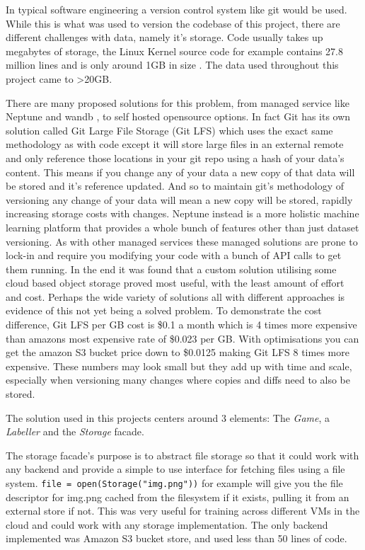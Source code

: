 In typical software engineering a version control system like git \cite{} would be used.  While this is what was used to version the codebase of this project,
there are different challenges with data, namely it's storage.  Code usually takes up megabytes of storage, the Linux Kernel source code for example contains
27.8 million lines and is only around 1GB in size \cite{}.  The data used throughout this project came to >20GB.

There are many proposed solutions for this problem, from managed service like Neptune \cite{} and wandb \cite{}, to self hosted opensource options.  In fact Git has its own
solution called Git Large File Storage (Git LFS) \cite{} which uses the exact same methodology as with code except it will store large files in an external 
remote and only reference those locations in your git repo using a hash of your data's content.  This means if you change any of your data a new copy 
of that data will be stored and it's reference updated.  And so to maintain git's methodology of versioning any change of your data will mean a new copy 
will be stored, rapidly increasing storage costs with changes.  Neptune instead is a more holistic machine learning platform that provides a whole bunch of 
features other than just dataset versioning.  As with other managed services these managed solutions are prone to lock-in and require you modifying your code 
with a bunch of API calls to get them running.
In the end it was found that a custom solution utilising some cloud based object storage proved most useful, with the least amount of effort and cost.  
Perhaps the wide variety of solutions all with different approaches is evidence of this not yet being
a solved problem.  To demonstrate the cost difference, Git LFS per GB cost is \$0.1 a month which is 4 times more expensive
than amazons most expensive rate of \$0.023 per GB.  With optimisations you can get the amazon S3 bucket price down to \$0.0125 making Git LFS 8 times
more expensive.  These numbers may look small but they add up with time and scale, especially when versioning many changes where copies and diffs need
to also be stored.

The solution used in this projects centers around 3 elements: The \textit{Game}, a \textit{Labeller} and the \textit{Storage} facade.  

The storage 
facade's purpose is to abstract file storage so that it could work with any backend and provide a simple to use interface for fetching files using a file system.
\verb|file = open(Storage("img.png"))| 
for example will give you the file descriptor for img.png cached from the filesystem if it exists, pulling it from an external store if not.  
This was very useful for training across different VMs in the cloud and could work with any storage implementation.
The only backend implemented was Amazon S3 bucket store, and used less than 50 lines of code.

